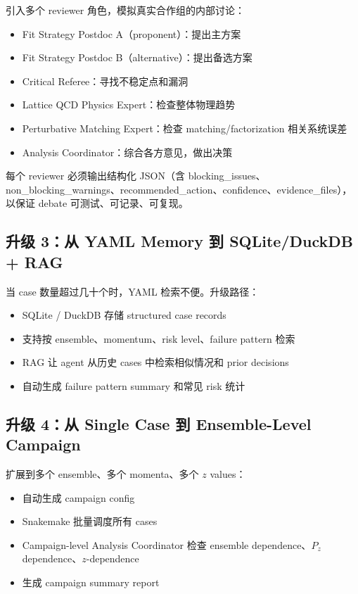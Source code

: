 \documentclass[11pt,a4paper,fontset=fandol]{ctexart}
\begin{document}
引入多个 reviewer 角色，模拟真实合作组的内部讨论：
\begin{itemize}
  \item Fit Strategy Postdoc A（proponent）：提出主方案
  \item Fit Strategy Postdoc B（alternative）：提出备选方案
  \item Critical Referee：寻找不稳定点和漏洞
  \item Lattice QCD Physics Expert：检查整体物理趋势
  \item Perturbative Matching Expert：检查 matching/factorization 相关系统误差
  \item Analysis Coordinator：综合各方意见，做出决策
\end{itemize}

每个 reviewer 必须输出结构化 JSON（含 blocking\_issues、non\_blocking\_warnings、recommended\_action、confidence、evidence\_files），以保证 debate 可测试、可记录、可复现。

\subsection{升级 3：从 YAML Memory 到 SQLite/DuckDB + RAG}

当 case 数量超过几十个时，YAML 检索不便。升级路径：
\begin{itemize}
  \item SQLite / DuckDB 存储 structured case records
  \item 支持按 ensemble、momentum、risk level、failure pattern 检索
  \item RAG 让 agent 从历史 cases 中检索相似情况和 prior decisions
  \item 自动生成 failure pattern summary 和常见 risk 统计
\end{itemize}

\subsection{升级 4：从 Single Case 到 Ensemble-Level Campaign}

扩展到多个 ensemble、多个 momenta、多个 $z$ values：
\begin{itemize}
  \item 自动生成 campaign config
  \item Snakemake 批量调度所有 cases
  \item Campaign-level Analysis Coordinator 检查 ensemble dependence、$P_z$ dependence、$z$-dependence
  \item 生成 campaign summary report
\end{itemize}
\end{document}

